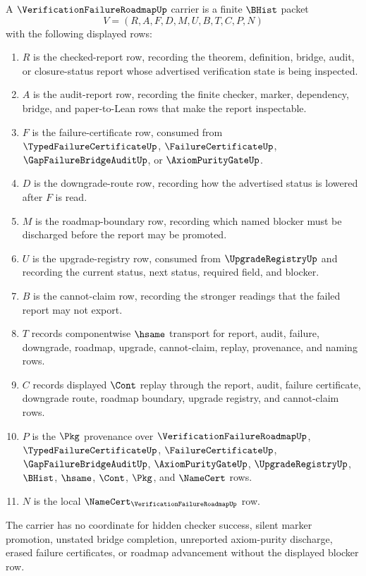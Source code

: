 \begin{definition}
\label{def:verification-failure-roadmap-carrier}
A $\VerificationFailureRoadmapUp$ carrier is a finite $\BHist$ packet
$$
V=(R,A,F,D,M,U,B,T,C,P,N)
$$
with the following displayed rows:
\begin{enumerate}
\item $R$ is the checked-report row, recording the theorem, definition, bridge, audit, or closure-status report whose advertised verification state is being inspected.
\item $A$ is the audit-report row, recording the finite checker, marker, dependency, bridge, and paper-to-Lean rows that make the report inspectable.
\item $F$ is the failure-certificate row, consumed from $\TypedFailureCertificateUp$, $\FailureCertificateUp$, $\GapFailureBridgeAuditUp$, or $\AxiomPurityGateUp$.
\item $D$ is the downgrade-route row, recording how the advertised status is lowered after $F$ is read.
\item $M$ is the roadmap-boundary row, recording which named blocker must be discharged before the report may be promoted.
\item $U$ is the upgrade-registry row, consumed from $\UpgradeRegistryUp$ and recording the current status, next status, required field, and blocker.
\item $B$ is the cannot-claim row, recording the stronger readings that the failed report may not export.
\item $T$ records componentwise $\hsame$ transport for report, audit, failure, downgrade, roadmap, upgrade, cannot-claim, replay, provenance, and naming rows.
\item $C$ records displayed $\Cont$ replay through the report, audit, failure certificate, downgrade route, roadmap boundary, upgrade registry, and cannot-claim rows.
\item $P$ is the $\Pkg$ provenance over $\VerificationFailureRoadmapUp$, $\TypedFailureCertificateUp$, $\FailureCertificateUp$, $\GapFailureBridgeAuditUp$, $\AxiomPurityGateUp$, $\UpgradeRegistryUp$, $\BHist$, $\hsame$, $\Cont$, $\Pkg$, and $\NameCert$ rows.
\item $N$ is the local $\NameCert_{\VerificationFailureRoadmapUp}$ row.
\end{enumerate}
The carrier has no coordinate for hidden checker success, silent marker promotion, unstated bridge completion, unreported axiom-purity discharge, erased failure certificates, or roadmap advancement without the displayed blocker row.
\end{definition}

